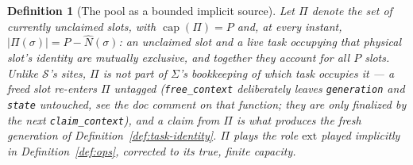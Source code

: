 \documentclass[11pt,a4paper]{report}
\newtheorem{definition}{Definition}[section]
\newcommand{\Num}{\hat{N}}
\newcommand{\code}[1]{\texttt{#1}}
\begin{document}
\begin{definition}[The pool as a bounded implicit source]
\label{def:pool}
Let $\Pi$ denote the set of currently unclaimed slots, with
$\operatorname{cap}(\Pi) = P$ and, at every instant,
$|\Pi(\sigma)| = P - \Num(\sigma)$: an unclaimed slot and a live task
occupying that physical slot's identity are mutually exclusive, and
together they account for all $P$ slots. Unlike $\mathcal{S}$'s sites,
$\Pi$ is not part of $\Sigma$'s bookkeeping of \emph{which} task
occupies it --- a freed slot re-enters $\Pi$ untagged
(\code{free\_context} deliberately leaves \code{generation} and
\code{state} untouched, see the doc comment on that function; they are
only finalized by the \emph{next} \code{claim\_context}), and a claim
from $\Pi$ is what produces the fresh generation of
Definition~\ref{def:task-identity}. $\Pi$ plays the role $\text{ext}$
played implicitly in Definition~\ref{def:ops}, corrected to its true,
finite capacity.
\end{definition}
\end{document}
